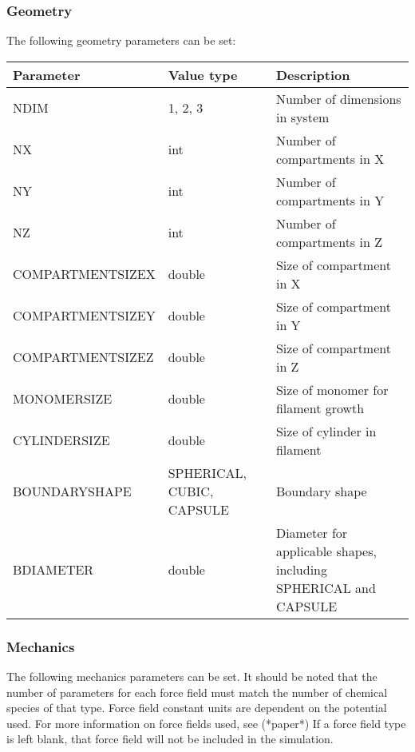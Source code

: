 \documentclass[11pt, oneside]{article}   	%
\begin{document}
\subsubsection{Geometry}

The following geometry parameters can be set:

\begin{table} [!ht]
\centering
\begin{tabular}{|L{5cm}|C{3cm}|L{6.8cm}|}  
\hline
 \textbf{Parameter} & \textbf{Value type} & \textbf{Description} \\
 \hline
  NDIM & 1, 2, 3 & Number of dimensions in system \\
  \hline
  NX & int & Number of compartments in X \\
  \hline
  NY & int & Number of compartments in Y \\
  \hline
  NZ & int & Number of compartments in Z \\
  \hline
  COMPARTMENTSIZEX & double & Size of compartment in X \\
  \hline
  COMPARTMENTSIZEY & double & Size of compartment in Y \\
  \hline
  COMPARTMENTSIZEZ & double & Size of compartment in Z \\
  \hline
  MONOMERSIZE & double & Size of monomer for filament growth \\
  \hline
  CYLINDERSIZE & double & Size of cylinder in filament\\
  \hline
  BOUNDARYSHAPE & SPHERICAL, CUBIC, CAPSULE & Boundary shape \\
  \hline
  BDIAMETER & double & Diameter for applicable shapes, including SPHERICAL and CAPSULE \\
  \hline

\end{tabular}
\end{table}

\break
\subsubsection{Mechanics}

The following mechanics parameters can be set. It should be noted that the number of parameters for each force field must match the number of chemical species of that type. Force field constant units are dependent on the potential used. For more information on force fields used, see (*paper*)
\newline\newline
\noindent If a force field type is left blank, that force field will not be included in the simulation.
\end{document}
